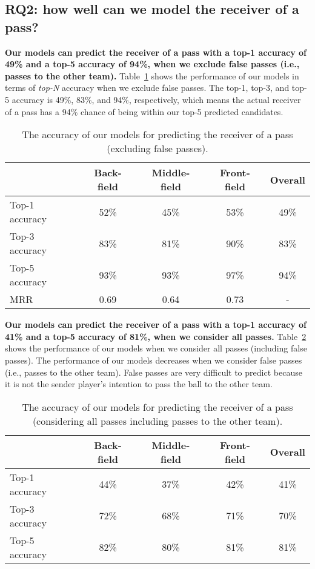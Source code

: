 \subsection{RQ2: how well can we model the receiver of a pass?}\label{RQ2-results}

\textbf{Our models can predict the receiver of a pass with a top-1 accuracy of 49\% and a top-5 accuracy of 94\%, when we exclude false passes (i.e., passes to the other team).}
Table~\ref{tab:performance-accurate-passes} shows the performance of our models in terms of \textit{top-N} accuracy when we exclude false passes. 
The top-1, top-3, and top-5 accuracy is 49\%, 83\%, and 94\%, respectively, which means the actual receiver of a pass has a 94\% chance of being within our top-5 predicted candidates.

\begin{table}[!t]
\caption{The accuracy of our models for predicting the receiver of a pass (excluding false passes).}
\centering
\begin{tabular}{lcccc}
  \hline
  & Back-field & Middle-field & Front-field & Overall \\
  \hline
  Top-1 accuracy & 52\% & 45\% & 53\% & 49\% \\
  Top-3 accuracy & 83\% & 81\% & 90\% & 83\% \\
  Top-5 accuracy & 93\% & 93\% & 97\% & 94\% \\
  MRR & 0.69 & 0.64 & 0.73 & - \\
  \hline
\end{tabular}
\label{tab:performance-accurate-passes}
\end{table}

\textbf{Our models can predict the receiver of a pass with a top-1 accuracy of 41\% and a top-5 accuracy of 81\%, when we consider all passes.}
Table~\ref{tab:performance-all-passes} shows the performance of our models when we consider all passes (including false passes). 
The performance of our models decreases when we consider false passes (i.e., passes to the other team). 
False passes are very difficult to predict because it is not the sender player's intention to pass the ball to the other team. 

\begin{table}[!t]
\caption{The accuracy of our models for predicting the receiver of a pass (considering all passes including passes to the other team).}
\centering
\begin{tabular}{lcccc}
  \hline
  & Back-field & Middle-field & Front-field & Overall \\
  \hline
  Top-1 accuracy & 44\% & 37\% & 42\% & 41\% \\
  Top-3 accuracy & 72\% & 68\% & 71\% & 70\% \\
  Top-5 accuracy & 82\% & 80\% & 81\% & 81\% \\
  \hline
\end{tabular}
\label{tab:performance-all-passes}
\end{table}

